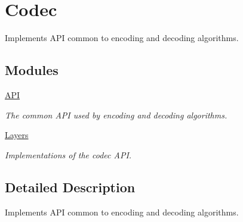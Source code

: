 \hypertarget{group__codec}{\section{Codec}
\label{group__codec}
}


Implements A\-P\-I common to encoding and decoding algorithms.  


\subsection*{Modules}
\begin{DoxyCompactItemize}
\item 
\hyperlink{group__codec__api}{A\-P\-I}
\begin{DoxyCompactList}\small\item\em The common A\-P\-I used by encoding and decoding algorithms. \end{DoxyCompactList}\item 
\hyperlink{group__codec__layers}{Layers}
\begin{DoxyCompactList}\small\item\em Implementations of the codec A\-P\-I. \end{DoxyCompactList}\end{DoxyCompactItemize}


\subsection{Detailed Description}
Implements A\-P\-I common to encoding and decoding algorithms. 
